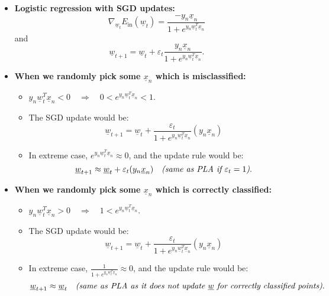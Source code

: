 \begin{definition}
    \begin{itemize}
        \item \textbf{Logistic regression with SGD updates:}
        \[
        \nabla_{\underline{w}_t} E_{\text{in}}(\underline{w}_t) = \frac{-y_n \underline{x}_n}{1 + e^{y_n \underline{w}_t^T \underline{x}_n}}
        \]
        and
        \[
        \underline{w}_{t+1} = \underline{w}_t + \varepsilon_t \frac{y_n \underline{x}_n}{1 + e^{y_n \underline{w}_t^T \underline{x}_n}}.
        \]
    
        \item \textbf{When we randomly pick some \( \underline{x}_n \) which is misclassified:}
        \begin{itemize}[left=0pt]
            \item \( y_n \underline{w}_t^T \underline{x}_n < 0 \quad \Rightarrow \quad 0 < e^{y_n \underline{w}_t^T \underline{x}_n} < 1 \).
            \item The SGD update would be:
            \[
            \underline{w}_{t+1} = \underline{w}_t + \frac{\varepsilon_t}{1 + e^{y_n \underline{w}_t^T \underline{x}_n}} (y_n \underline{x}_n)
            \]
            \item In extreme case, \( e^{y_n \underline{w}_t^T \underline{x}_n} \approx 0 \), and the update rule would be:
            \[
            \underline{w}_{t+1} \approx \underline{w}_t + \varepsilon_t (y_n \underline{x}_n) \quad \textit{(same as PLA if \( \varepsilon_t = 1 \))}.
            \]
        \end{itemize}
    

        \item \textbf{When we randomly pick some \( \underline{x}_n \) which is correctly classified:}
        \begin{itemize}[left=0pt]
            \item \( y_n \underline{w}_t^T \underline{x}_n > 0 \quad \Rightarrow \quad 1 < e^{y_n \underline{w}_t^T \underline{x}_n} \).
            \item The SGD update would be:
            \[
            \underline{w}_{t+1} = \underline{w}_t + \frac{\varepsilon_t}{1 + e^{y_n \underline{w}_t^T \underline{x}_n}} (y_n \underline{x}_n)
            \]
            \item In extreme case, \( \frac{1}{1 + e^{y_n \underline{w}_t^T \underline{x}_n}} \approx 0 \), and the update rule would be:
            \[
            \underline{w}_{t+1} \approx \underline{w}_t \quad \textit{(same as PLA as it does not update \( \underline{w} \) for correctly classified points)}.
            \]
        \end{itemize}
    \end{itemize}
\end{definition}

